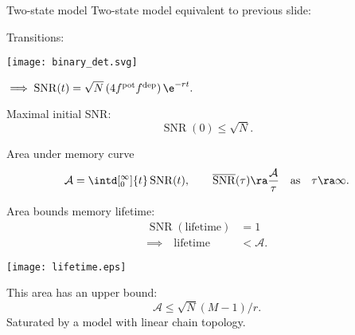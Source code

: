 \documentclass[final]{beamer}%
\DeclareMathOperator{\SNR}{SNR}
\DeclareMathOperator{\snr}{SNR}
\newcommand{\snrb}{\overline{\snr}}
\newcommand{\pot}{^{\text{pot}}}
\newcommand{\dep}{^{\text{dep}}}
\newcommand{\area}{\mathcal{A}}
\begin{document}
\begin{frame}{Two-state model}
%
 Two-state model equivalent to previous slide:
  \begin{center}
  Transitions:
   \parbox{2cm}{\texttt{[image: binary\_det.svg]}}
   $\implies\snr(t)=\sqrt{N}\,(4 f\pot f\dep)\,\e^{-rt}.$
  \end{center}

 \vp Maximal initial SNR:\note[item]{$f\pot=\half$}
 \begin{equation*}
   \snr(0) \leq \sqrt{N}.
 \end{equation*}
%
\end{frame}


\begin{frame}{Area under memory curve}
%
  \begin{equation*}
    \area = \intd[_0^\infty]{t} \snr(t),
    \qquad
    \snrb(\tau) \ra \frac{\area}{\tau}
    \quad \text{as} \quad \tau \ra \infty.
  \end{equation*}
%


  \vp\parbox{5cm}{
  Area bounds memory lifetime:\\
  \begin{equation*}
  \begin{aligned}
    \SNR(\text{lifetime})&=1
    \\
    \implies
    \quad
    \text{lifetime} &< \area.
  \end{aligned}
  \end{equation*}
  }
  \parbox{6.5cm}{
    \texttt{[image: lifetime.eps]}
  }

  \vp This area has an upper bound:
  \begin{equation*}
    \area \leq \sqrt{N}(M-1)/r.
  \end{equation*}
  Saturated by a model with linear chain topology.
%
\end{frame}

\end{document}
